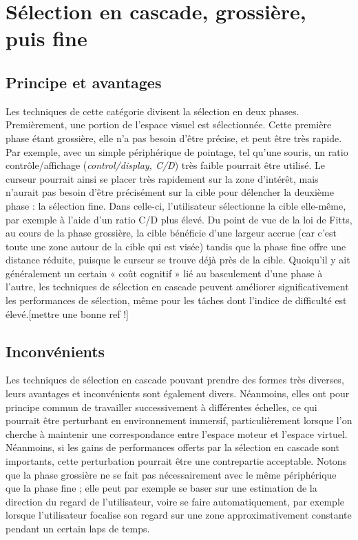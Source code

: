 \section{Sélection en cascade, grossière, puis fine}
	 \subsection{Principe et avantages}
	 Les techniques de cette catégorie divisent la sélection en deux phases. Premièrement, une portion de l'espace visuel est sélectionnée. Cette première phase étant grossière, elle n'a pas besoin d'être précise, et peut être très rapide. Par exemple, avec un simple périphérique de pointage, tel qu'une souris, un ratio contrôle/affichage (\emph{control/display, C/D}) très faible pourrait être utilisé. Le curseur pourrait ainsi se placer très rapidement sur la zone d'intérêt, mais n'aurait pas besoin d'être précisément sur la cible pour délencher la deuxième phase : la sélection fine. Dans celle-ci, l'utilisateur sélectionne la cible elle-même, par exemple à l'aide d'un ratio C/D plus élevé. Du point de vue de la loi de Fitts, au cours de la phase grossière, la cible bénéficie d'une largeur accrue (car c'est toute une zone autour de la cible qui est visée) tandis que la phase fine offre une distance réduite, puisque le curseur se trouve déjà près de la cible. Quoiqu'il y ait généralement un certain « coût cognitif » lié au basculement d'une phase à l'autre, les techniques de sélection en cascade peuvent améliorer significativement les performances de sélection, même pour les tâches dont l'indice de difficulté est élevé.[mettre une bonne ref !]
		 
	\subsection{Inconvénients}
	Les techniques de sélection en cascade pouvant prendre des formes très diverses, leurs avantages et inconvénients sont également divers. Néanmoins, elles ont pour principe commun de travailler successivement à différentes échelles, ce qui pourrait être perturbant en environnement immersif, particulièrement lorsque l'on cherche à maintenir une correspondance entre l'espace moteur et l'espace virtuel. Néanmoins, si les gains de performances offerts par la sélection en cascade sont importants, cette perturbation pourrait être une contrepartie acceptable. Notons que la phase grossière ne se fait pas nécessairement avec le même périphérique que la phase fine ; elle peut par exemple se baser sur une estimation de la direction du regard de l'utilisateur, voire se faire automatiquement, par exemple lorsque l'utilisateur focalise son regard sur une zone approximativement constante pendant un certain laps de temps.


